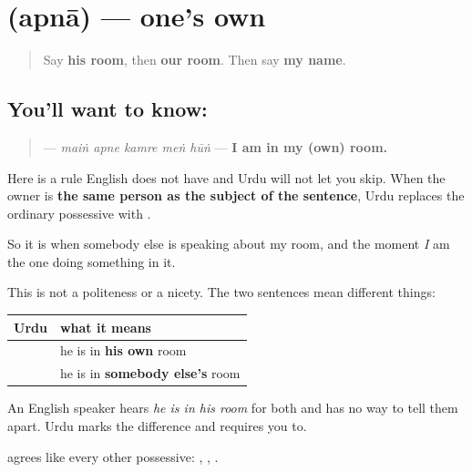 \section[\texorpdfstring{\ur{اپنا} (apnā)}{اپنا (apnā)}]{ (apnā) — one's own}

\label{lesson:UR-C26-apna}



\begin{quote}
Say \textbf{his room}, then \textbf{our room}. Then say \textbf{my name}.
\end{quote}

\subsection*{You'll want to know: }
\begin{quote}
\textbf{    } — \emph{maiṅ apne kamre meṅ hūṅ} — \textbf{I am in my (own) room.}
\end{quote}

Here is a rule English does not have and Urdu will not let you skip. When the owner is \textbf{the same person as the subject of the sentence}, Urdu replaces the ordinary possessive with \textbf{}.

So it is \textbf{ } when somebody else is speaking about my room, and \textbf{ } the moment \emph{I} am the one doing something in it.

\begin{grammarlens}[title={Grammar Lens: getting it wrong changes the meaning}]
This is not a politeness or a nicety. The two sentences mean different things:

\noindent
\begin{tabularx}{\linewidth}{@{}>{\raggedright\arraybackslash}X>{\raggedright\arraybackslash}X@{}}
\toprule
\textbf{Urdu} & \textbf{what it means} \\
\midrule
\textbf{\ur{وہ} \ur{اپنے} \ur{کمرے} \ur{میں} \ur{ہے}} & he is in \textbf{his own} room \\
\textbf{\ur{وہ} \ur{اس} \ur{کے} \ur{کمرے} \ur{میں} \ur{ہے}} & he is in \textbf{somebody else's} room \\
\bottomrule
\end{tabularx}

An English speaker hears \emph{he is in his room} for both and has no way to tell them apart. Urdu marks the difference and requires you to.

\textbf{} agrees like every other possessive: \textbf{ }, \textbf{ }, \textbf{  }.
\end{grammarlens}

